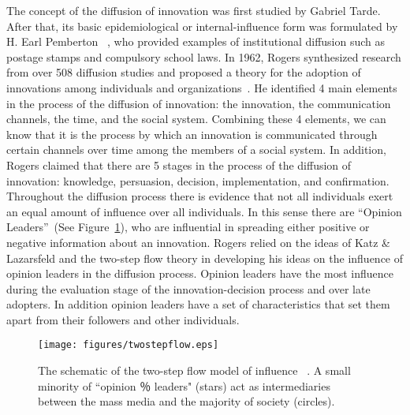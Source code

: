 The concept of the diffusion of innovation was first studied by Gabriel Tarde. After that, its basic epidemiological or internal-influence form was formulated by H. Earl Pemberton ~\cite{pemberton1936curve}, who provided examples of institutional diffusion such as postage stamps and compulsory school laws. In 1962, Rogers synthesized research from over 508 diffusion studies and proposed a theory for the adoption of innovations among individuals and organizations~\cite{rogers1995diffusion}. He identified 4 main elements in the process of the diffusion of innovation: the innovation, the communication channels, the time, and the social system. Combining these 4 elements, we can know that it is the process by which an innovation is communicated through certain channels over time among the members of a social system. In addition, Rogers claimed that there are 5 stages in the process of the diffusion of innovation: knowledge, persuasion, decision, implementation, and confirmation. Throughout the diffusion process there is evidence that not all individuals exert an equal amount of influence over all individuals. In this sense there are ``Opinion Leaders''~\cite{katz1955personal}(See Figure~\ref{fig:tsf}), who are influential in spreading either positive or negative information about an innovation. Rogers relied on the ideas of Katz & Lazarsfeld and the two-step flow theory in developing his ideas on the influence of opinion leaders in the diffusion process. Opinion leaders have the most influence during the evaluation stage of the innovation-decision process and over late adopters. In addition opinion leaders have a set of characteristics that set them apart from their followers and other individuals.

\begin{figure}[!htb]
  \centering
  \texttt{[image: figures/twostepflow.eps]}
  \caption{The schematic of the two-step flow model of influence ~\cite{watts2007influentials}. A small minority of ``opinion ％ leaders" (stars) act as intermediaries between the mass media and the majority of society (circles).}
  \label{fig:tsf}
\end{figure}

